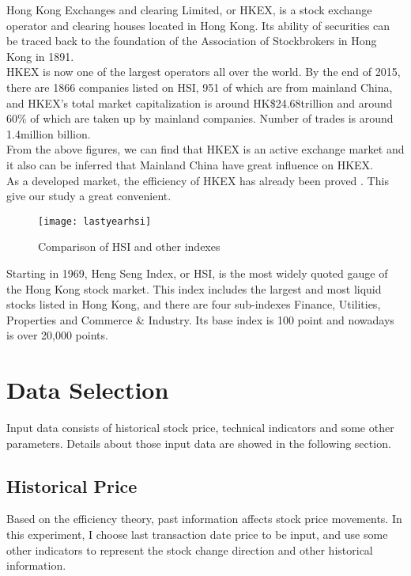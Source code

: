 Hong Kong Exchanges and clearing Limited, or HKEX, is a stock exchange operator and clearing houses located in Hong Kong. Its ability of securities can be traced back to the foundation of the Association of Stockbrokers in Hong Kong in 1891\cite{1_history_hkex_markets_2016}.\\

HKEX is now one of the largest operators all over the world. By the end of 2015, there are 1866 companies listed on HSI, 951 of which are from mainland China, and HKEX’s total market capitalization is around HK\$24.68trillion and around 60\% of which are taken up by mainland companies. Number of trades is around 1.4million billion\cite{hkex_fact_book_2015}.\\

From the above figures, we can find that HKEX is an active exchange market and it also can be inferred that Mainland China have great influence on HKEX.\\

As a developed market, the efficiency of HKEX has already been proved \cite{su2015efficiency}. This give our study a great convenient.

\begin{figure}[ht]
	\centering
	\texttt{[image: lastyearhsi]}
	\caption{Comparison of HSI and other indexes}
\end{figure}

Starting in 1969, Heng Seng Index, or HSI, is the most widely quoted gauge of the Hong Kong stock market\cite{hsi_company_profile}. This index includes the largest and most liquid stocks listed in Hong Kong, and there are four sub-indexes Finance, Utilities, Properties and Commerce \& Industry\cite{heng_seng_index}. Its base index is 100 point and nowadays is over 20,000 points.

\section{Data Selection}

Input data consists of historical stock price, technical indicators and some other parameters. Details about those input data are showed in the following section.

\subsection{Historical Price}
Based on the efficiency theory, past information affects stock price movements. In this experiment, I choose last transaction date price to be input, and use some other indicators to represent the stock change direction and other historical information.

